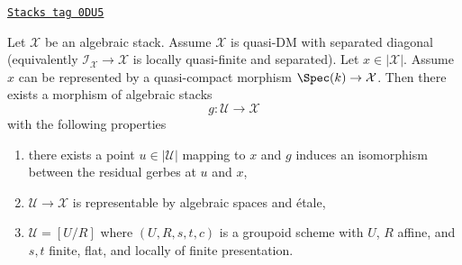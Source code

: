 \begin{lemma}
\label{stacks-morphisms-lemma-etale-local-quasi-DM-at-x-inertia}
\href{https://stacks.math.columbia.edu/tag/0DU5}{\texttt{Stacks tag 0DU5}}

Let $\mathcal{X}$ be an algebraic stack. Assume $\mathcal{X}$ is
quasi-DM with separated diagonal (equivalently
$\mathcal{I}_\mathcal{X} \to \mathcal{X}$ is locally quasi-finite and
separated). Let $x \in |\mathcal{X}|$. Assume $x$ can be represented
by a quasi-compact morphism $\Spec(k) \to \mathcal{X}$.
Then there exists a morphism of algebraic stacks
$$
g : \mathcal{U} \longrightarrow \mathcal{X}
$$
with the following properties
\begin{enumerate}
\item there exists a point $u \in |\mathcal{U}|$ mapping to $x$ and
$g$ induces an isomorphism between the residual gerbes at $u$ and $x$,
\item $\mathcal{U} \to \mathcal{X}$ is representable by algebraic spaces and
\'etale,
\item $\mathcal{U} = [U/R]$ where $(U, R, s, t, c)$ is a groupoid
scheme with $U$, $R$ affine, and $s, t$ finite, flat, and
locally of finite presentation.
\end{enumerate}
\end{lemma}

